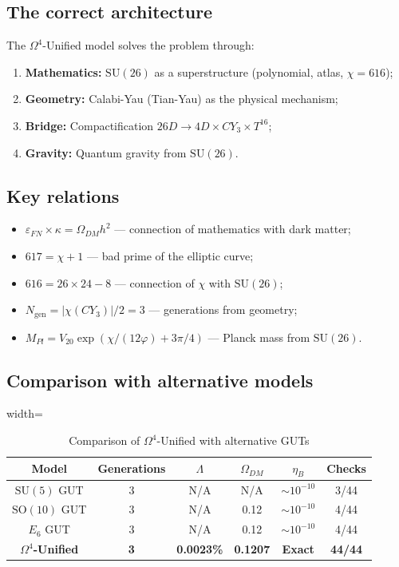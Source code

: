 \documentclass[12pt,a4paper,twoside]{article}
\newcommand{\SU}{\mathrm{SU}}
\newcommand{\SO}{\mathrm{SO}}
\newcommand{\EPS}{\varepsilon}
\theoremstyle{definition}
\begin{document}
\subsection{The correct architecture}

The $\Omega^4$-Unified model solves the problem through:
\begin{enumerate}
    \item \textbf{Mathematics:} $\SU(26)$ as a superstructure (polynomial, atlas, $\chi = 616$);
    \item \textbf{Geometry:} Calabi-Yau (Tian-Yau) as the physical mechanism;
    \item \textbf{Bridge:} Compactification $26D \to 4D \times CY_3 \times T^{16}$;
    \item \textbf{Gravity:} Quantum gravity from $\SU(26)$.
\end{enumerate}

\subsection{Key relations}

\begin{itemize}
    \item $\EPS_{FN} \times \kappa = \Omega_{DM} h^2$ — connection of mathematics with dark matter;
    \item $617 = \chi + 1$ — bad prime of the elliptic curve;
    \item $616 = 26 \times 24 - 8$ — connection of $\chi$ with $\SU(26)$;
    \item $N_{\text{gen}} = |\chi(CY_3)|/2 = 3$ — generations from geometry;
    \item $M_{Pl} = V_{20} \exp(\chi/(12\varphi) + 3\pi/4)$ — Planck mass from $\SU(26)$.
\end{itemize}

\subsection{Comparison with alternative models}

\begin{table}[H]
\centering
\small
\caption{Comparison of $\Omega^4$-Unified with alternative GUTs}
\label{tab:comparison}
\begin{adjustbox}{width=\textwidth}
\begin{tabular}{c|c|c|c|c|c}
\toprule
\textbf{Model} & \textbf{Generations} & \textbf{$\Lambda$} & \textbf{$\Omega_{DM}$} & \textbf{$\eta_B$} & \textbf{Checks} \\
\midrule
$\SU(5)$ GUT & 3 & N/A & N/A & $\sim 10^{-10}$ & 3/44 \\
$\SO(10)$ GUT & 3 & N/A & 0.12 & $\sim 10^{-10}$ & 4/44 \\
$E_6$ GUT & 3 & N/A & 0.12 & $\sim 10^{-10}$ & 4/44 \\
\textbf{$\Omega^4$-Unified} & \textbf{3} & \textbf{0.0023\%} & \textbf{0.1207} & \textbf{Exact} & \textbf{44/44} \\
\bottomrule
\end{tabular}
\end{adjustbox}
\end{table}
\end{document}
